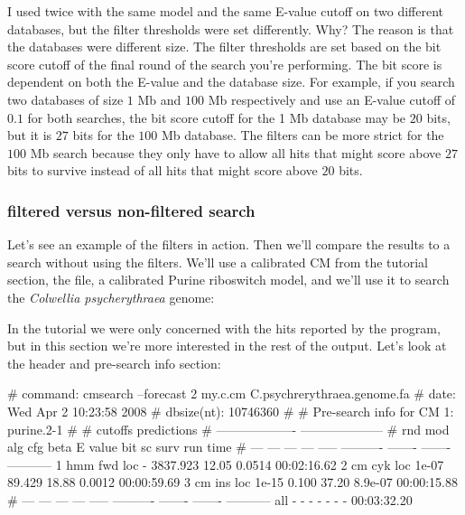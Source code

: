 \begin{srefaq}{I used  twice with the same model and
    the same E-value cutoff on two different databases, but the filter
    thresholds were set differently. Why?} The reason is that the
    databases were different size. The filter thresholds are set based
    on the bit score cutoff of the final round of the search you're
    performing. The bit score is dependent on both the E-value and the
    database size. For example, if you search two databases of size $1$
    Mb and $100$ Mb respectively and use an E-value cutoff of $0.1$ for both
    searches, the bit score cutoff for the 1 Mb database may be $20$
    bits, but it is $27$ bits for the $100$ Mb database. The filters
    can be more strict for the $100$ Mb search because they only have
    to allow all hits that might score above $27$ bits to
    survive instead of all hits that might score above $20$ bits. 
\end{srefaq}

\subsubsection{filtered versus non-filtered search}

Let's see an example of the filters in action. Then we'll compare the
results to a search without using the filters. We'll use a calibrated
CM from the tutorial section, the  file, a
calibrated Purine riboswitch model, and we'll use it to search the
\emph{Colwellia psycherythraea} genome:


In the tutorial we were only concerned with the hits reported by the
program, but in this section we're more interested in the rest of the
output. Let's look at the header and pre-search info section:

\begin{sreoutput}
# command:    cmsearch --forecast 2 my.c.cm C.psychrerythraea.genome.fa
# date:       Wed Apr  2 10:23:58 2008
# dbsize(nt): 10746360
#
# Pre-search info for CM 1: purine.2-1
#
#                                  cutoffs            predictions     
#                            -------------------  --------------------
# rnd  mod  alg  cfg   beta     E value   bit sc     surv     run time
# ---  ---  ---  ---  -----  ----------  -------  -------  -----------
    1  hmm  fwd  loc      -    3837.923    12.05   0.0514  00:02:16.62
    2   cm  cyk  loc  1e-07      89.429    18.88   0.0012  00:00:59.69
    3   cm  ins  loc  1e-15       0.100    37.20  8.9e-07  00:00:15.88
# ---  ---  ---  ---  -----  ----------  -------  -------  -----------
  all    -    -    -      -           -        -        -  00:03:32.20
\end{sreoutput}

